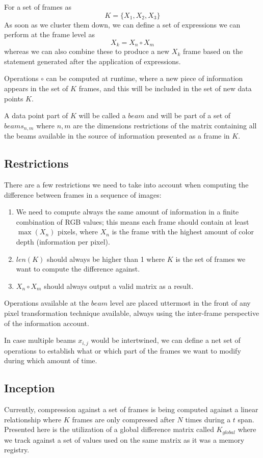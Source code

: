 \documentclass[twocolumn]{article}
\begin{document}
For a set of frames as
$$
K = \{X_1,X_2,X_3\}
$$
As soon as we cluster them down, we can define a set of expressions we can perform at the frame level as  $$X_{k} = X_{n} \circ X_{m}$$ whereas we can also combine these to produce a new $X_{k}$ frame based on the statement generated after the application of expressions.

Operations $\circ$ can be computed at runtime, where a new piece of information appears in the set of $K$ frames, and this will be included in the set of new data points $K$. 

A data point part of $K$ will be called a $beam$ and will be part of a set of $beams_{n,m}$ where $n,m$ are the dimensions restrictions of the matrix containing all the beams available in the source of information presented as a frame in $K$.

\subsection{Restrictions}
There are a few restrictions we need to take into account when computing the difference between frames in a sequence of images:

\begin{enumerate}
    \item We need to compute always the same amount of information in a finite combination of RGB values; this means each frame should contain at least $\max(X_n)$ pixels, where $X_n$ is the frame with the highest amount of color depth (information per pixel).
    \item ${len}(K)$ should always be higher than 1 where $K$ is the set of frames we want to compute the difference against.
    \item $X_{n} \circ X_{m}$ should always output a valid matrix as a result.
\end{enumerate}

Operations available at the $beam$ level are placed uttermost in the front of any pixel transformation technique available, always using the inter-frame perspective of the information account.

In case multiple beams $x_{i,j}$ would be intertwined, we can define a net set of operations to establish what or which part of the frames we want to modify during which amount of time.

\subsection{Inception}
Currently, compression against a set of frames is being computed against a linear relationship where $K$ frames are only compressed after $N$ times during a $t$ span. Presented here is the utilization of a global difference matrix called $K_{global}$ where we track against a set of values used on the same matrix as it was a memory registry.
\end{document}
